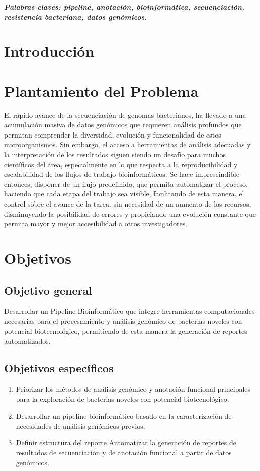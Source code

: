 \documentclass[12pt]{article}
\begin{document}
\vspace{10pt}
\textbf{\emph{Palabras claves: pipeline, anotación, bioinformática, secuenciación, resistencia bacteriana, datos genómicos.}}



\newpage
\section{Introducción}

\newpage
\section{Plantamiento del Problema}
El rápido avance  de la secuenciación de genomas bacterianos, ha llevado a una acumulación masiva de datos genómicos que requieren análisis profundos que permitan comprender la diversidad, evolución y funcionalidad de estos microorganismos. Sin embargo, el acceso a herramientas de análisis adecuadas y la interpretación de los resultados siguen siendo un desafío para muchos científicos del área, especialmente en lo que respecta a la reproducibilidad y escalabilidad de los flujos de trabajo bioinformáticos. Se hace imprescindible entonces, disponer de un flujo predefinido, que permita automatizar el proceso, haciendo que cada etapa del trabajo sea visible, facilitando de esta manera, el control sobre el avance de la tarea. sin necesidad de un aumento de los recursos,  disminuyendo la posibilidad de errores y  propiciando una evolución constante que permita mayor y mejor accesibilidad a otros investigadores.

\newpage
\section{Objetivos}
\subsection{Objetivo general}
Desarrollar un Pipeline Bioinformático que integre herramientas  computacionales necesarias para el procesamiento y  análisis genómico de bacterias noveles con potencial biotecnológico, permitiendo de esta manera la generación de reportes automatizados.
\subsection{Objetivos específicos}
\begin{enumerate}
    \item Priorizar los métodos de análisis genómico y anotación funcional principales para la exploración de bacterias noveles con potencial biotecnológico.
    \item Desarrollar un pipeline bioinformático basado en la caracterización de necesidades de análisis genómicos previos.
    \item Definir estructura del reporte Automatizar la generación de reportes de resultados de secuenciación y de anotación funcional a partir de datos genómicos.
\end{enumerate}
\end{document}
